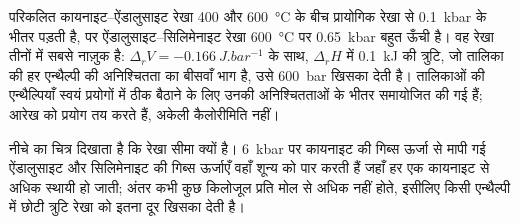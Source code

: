 परिकलित कायनाइट--ऐंडालुसाइट रेखा 400 और \qty{600}{\celsius} के बीच प्रायोगिक रेखा से
\qty{0.1}{kbar} के भीतर पड़ती है, पर ऐंडालुसाइट--सिलिमेनाइट रेखा \qty{600}{\celsius} पर
\qty{0.65}{kbar} बहुत ऊँची है। वह रेखा तीनों में सबसे नाज़ुक है:
$\Delta_r V = \qty{-0.166}{J.bar^{-1}}$ के साथ, $\Delta_r H$ में \qty{0.1}{kJ} की त्रुटि,
जो तालिका की हर एन्थैल्पी की अनिश्चितता का बीसवाँ भाग है, उसे
\qty{600}{bar} खिसका देती है। तालिकाओं की एन्थैल्पियाँ स्वयं प्रयोगों में ठीक बैठाने के लिए
उनकी अनिश्चितताओं के भीतर समायोजित की गई हैं; आरेख को प्रयोग तय करते हैं, अकेली
कैलोरीमिति नहीं।

नीचे का चित्र दिखाता है कि रेखा सीमा क्यों है। \qty{6}{kbar} पर
कायनाइट की गिब्स ऊर्जा से मापी गई ऐंडालुसाइट और सिलिमेनाइट की गिब्स ऊर्जाएँ वहाँ शून्य को पार करती हैं जहाँ हर एक
कायनाइट से अधिक स्थायी हो जाती; अंतर कभी कुछ किलोजूल प्रति मोल से अधिक नहीं होते,
इसीलिए किसी एन्थैल्पी में छोटी त्रुटि रेखा को इतना दूर खिसका देती है।

\begin{omfigure}
\centering
{}
\par{}
\end{omfigure}

